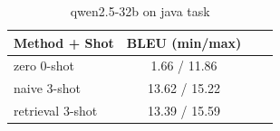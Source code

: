 \begin{table}[ht]
\centering
\small
\caption{qwen2.5-32b on java task}
\begin{tabular}{lccc}
\hline
Method + Shot & BLEU (min/max) \\
\hline
zero 0-shot & 1.66 / 11.86 \\
naive 3-shot & 13.62 / 15.22 \\
retrieval 3-shot & 13.39 / 15.59 \\
\hline
\end{tabular}
\end{table}
